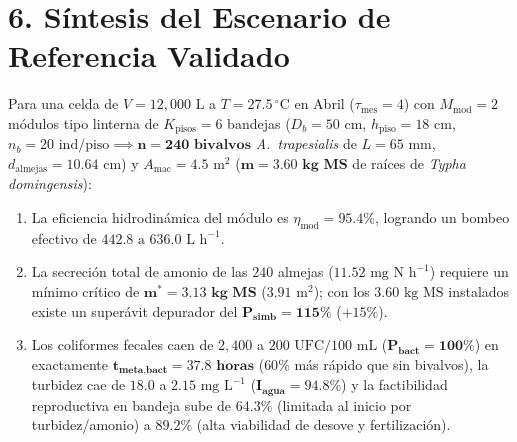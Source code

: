 \documentclass[11pt,letterpaper]{article}
\begin{document}
\section*{6. Síntesis del Escenario de Referencia Validado}
Para una celda de $V = 12,000\text{ L}$ a $T = 27.5\,^\circ\text{C}$ en Abril ($\tau_{\text{mes}} = 4$) con $M_{\text{mod}} = 2$ módulos tipo linterna de $K_{\text{pisos}} = 6$ bandejas ($D_b = 50\text{ cm}$, $h_{\text{piso}} = 18\text{ cm}$, $n_b = 20\text{ ind/piso} \implies \mathbf{n = 240\text{ bivalvos}}$ \textit{A.\ trapesialis} de $L = 65\text{ mm}$, $d_{\text{almejas}} = 10.64\text{ cm}$) y $A_{\text{mac}} = 4.5\text{ m}^2$ ($\mathbf{m = 3.60\text{ kg MS}}$ de raíces de \textit{Typha domingensis}):
\begin{enumerate}[leftmargin=1.5em,noitemsep]
    \item La eficiencia hidrodinámica del módulo es $\eta_{\text{mod}} = \mathbf{95.4\%}$, logrando un bombeo efectivo de $442.8\text{ a }636.0\text{ L h}^{-1}$.
    \item La secreción total de amonio de las $240$ almejas ($11.52\text{ mg N h}^{-1}$) requiere un mínimo crítico de $\mathbf{m^* = 3.13\text{ kg MS}}$ ($3.91\text{ m}^2$); con los $3.60\text{ kg MS}$ instalados existe un superávit depurador del $\mathbf{P_{\text{simb}} = 115\%}$ ($+15\%$).
    \item Los coliformes fecales caen de $2,400$ a $200\text{ UFC}/100\text{ mL}$ ($\mathbf{P_{\text{bact}} = 100\%}$) en exactamente $\mathbf{t_{\text{meta,bact}} = 37.8\text{ horas}}$ ($60\%$ más rápido que sin bivalvos), la turbidez cae de $18.0$ a $2.15\text{ mg L}^{-1}$ ($\mathbf{I_{\text{agua}} = 94.8\%}$) y la factibilidad reproductiva en bandeja sube de $\mathbf{64.3\%}$ (limitada al inicio por turbidez/amonio) a $\mathbf{89.2\%}$ (alta viabilidad de desove y fertilización).
\end{enumerate}
\end{document}
